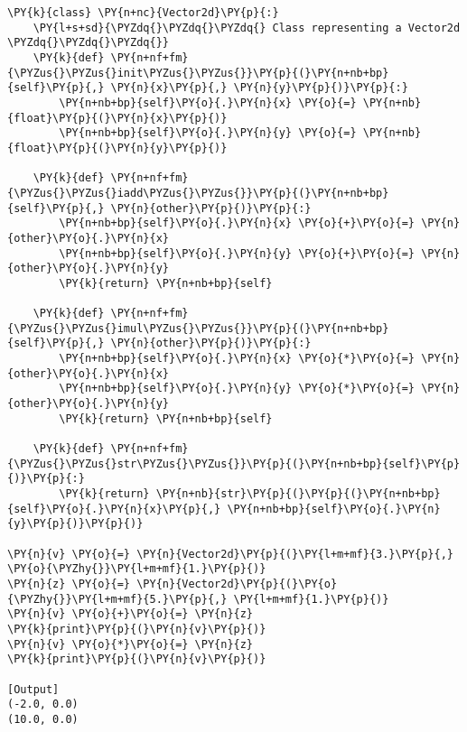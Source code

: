 \begin{Verbatim}[label=\makebox{\url{https://github.com/lucabaldini/cmepda/tree/master/slides/latex/snippets/vector2d\_inplace.py}},commandchars=\\\{\}]
\PY{k}{class} \PY{n+nc}{Vector2d}\PY{p}{:}
    \PY{l+s+sd}{\PYZdq{}\PYZdq{}\PYZdq{} Class representing a Vector2d \PYZdq{}\PYZdq{}\PYZdq{}}   
    \PY{k}{def} \PY{n+nf+fm}{\PYZus{}\PYZus{}init\PYZus{}\PYZus{}}\PY{p}{(}\PY{n+nb+bp}{self}\PY{p}{,} \PY{n}{x}\PY{p}{,} \PY{n}{y}\PY{p}{)}\PY{p}{:}
        \PY{n+nb+bp}{self}\PY{o}{.}\PY{n}{x} \PY{o}{=} \PY{n+nb}{float}\PY{p}{(}\PY{n}{x}\PY{p}{)}
        \PY{n+nb+bp}{self}\PY{o}{.}\PY{n}{y} \PY{o}{=} \PY{n+nb}{float}\PY{p}{(}\PY{n}{y}\PY{p}{)}
    
    \PY{k}{def} \PY{n+nf+fm}{\PYZus{}\PYZus{}iadd\PYZus{}\PYZus{}}\PY{p}{(}\PY{n+nb+bp}{self}\PY{p}{,} \PY{n}{other}\PY{p}{)}\PY{p}{:}
        \PY{n+nb+bp}{self}\PY{o}{.}\PY{n}{x} \PY{o}{+}\PY{o}{=} \PY{n}{other}\PY{o}{.}\PY{n}{x}
        \PY{n+nb+bp}{self}\PY{o}{.}\PY{n}{y} \PY{o}{+}\PY{o}{=} \PY{n}{other}\PY{o}{.}\PY{n}{y}
        \PY{k}{return} \PY{n+nb+bp}{self}
        
    \PY{k}{def} \PY{n+nf+fm}{\PYZus{}\PYZus{}imul\PYZus{}\PYZus{}}\PY{p}{(}\PY{n+nb+bp}{self}\PY{p}{,} \PY{n}{other}\PY{p}{)}\PY{p}{:}
        \PY{n+nb+bp}{self}\PY{o}{.}\PY{n}{x} \PY{o}{*}\PY{o}{=} \PY{n}{other}\PY{o}{.}\PY{n}{x}
        \PY{n+nb+bp}{self}\PY{o}{.}\PY{n}{y} \PY{o}{*}\PY{o}{=} \PY{n}{other}\PY{o}{.}\PY{n}{y}
        \PY{k}{return} \PY{n+nb+bp}{self}
        
    \PY{k}{def} \PY{n+nf+fm}{\PYZus{}\PYZus{}str\PYZus{}\PYZus{}}\PY{p}{(}\PY{n+nb+bp}{self}\PY{p}{)}\PY{p}{:}
        \PY{k}{return} \PY{n+nb}{str}\PY{p}{(}\PY{p}{(}\PY{n+nb+bp}{self}\PY{o}{.}\PY{n}{x}\PY{p}{,} \PY{n+nb+bp}{self}\PY{o}{.}\PY{n}{y}\PY{p}{)}\PY{p}{)}
     
\PY{n}{v} \PY{o}{=} \PY{n}{Vector2d}\PY{p}{(}\PY{l+m+mf}{3.}\PY{p}{,} \PY{o}{\PYZhy{}}\PY{l+m+mf}{1.}\PY{p}{)}
\PY{n}{z} \PY{o}{=} \PY{n}{Vector2d}\PY{p}{(}\PY{o}{\PYZhy{}}\PY{l+m+mf}{5.}\PY{p}{,} \PY{l+m+mf}{1.}\PY{p}{)}
\PY{n}{v} \PY{o}{+}\PY{o}{=} \PY{n}{z}
\PY{k}{print}\PY{p}{(}\PY{n}{v}\PY{p}{)}
\PY{n}{v} \PY{o}{*}\PY{o}{=} \PY{n}{z}
\PY{k}{print}\PY{p}{(}\PY{n}{v}\PY{p}{)}

[Output]
(-2.0, 0.0)
(10.0, 0.0)
\end{Verbatim}